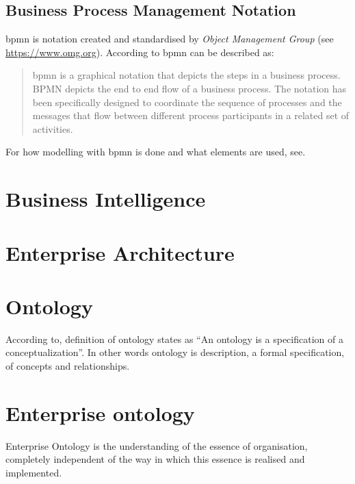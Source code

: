 \subsection{Business Process Management Notation}
\gls{bpmn} is notation created and standardised by \textit{Object Management Group} (see \url{https://www.omg.org}). According to\cite{bpmn-org-2018} \gls{bpmn} can be described as:
\begin{quote}
\gls{bpmn} is a graphical notation that depicts the steps in a business process. BPMN depicts the end to end flow of a business process. The notation has been specifically designed to coordinate the sequence of processes and the messages that flow between different process participants in a related set of activities.
\end{quote}

For how modelling with \gls{bpmn} is done and what elements are used, see\cite{bpmn-org-2018}.

\section{Business Intelligence}

\section{Enterprise Architecture}


\section{Ontology}
According to\cite{gruber-translation-1993}, definition of ontology states as ``An ontology is a specification of a conceptualization''. In other words ontology is description, a formal specification, of concepts and relationships.

\section{Enterprise ontology}
Enterprise Ontology\cite{perinforma-essence-2015} is the understanding of the essence of organisation, completely independent of the way in which this essence is realised and implemented.

